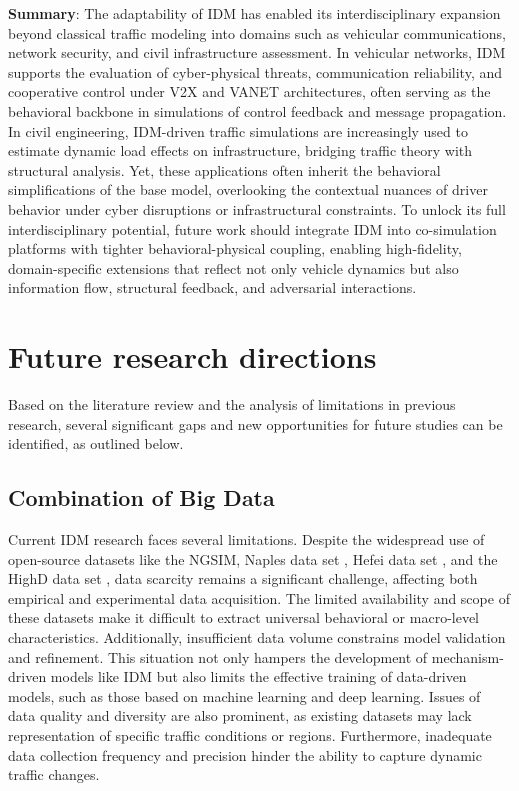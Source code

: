 \documentclass[a4paper,fleqn]{cas-sc}
\begin{document}
\textbf{Summary}: The adaptability of IDM has enabled its interdisciplinary expansion beyond classical traffic modeling into domains such as vehicular communications, network security, and civil infrastructure assessment. In vehicular networks, IDM supports the evaluation of cyber-physical threats, communication reliability, and cooperative control under V2X and VANET architectures, often serving as the behavioral backbone in simulations of control feedback and message propagation. In civil engineering, IDM-driven traffic simulations are increasingly used to estimate dynamic load effects on infrastructure, bridging traffic theory with structural analysis. Yet, these applications often inherit the behavioral simplifications of the base model, overlooking the contextual nuances of driver behavior under cyber disruptions or infrastructural constraints. To unlock its full interdisciplinary potential, future work should integrate IDM into co-simulation platforms with tighter behavioral-physical coupling, enabling high-fidelity, domain-specific extensions that reflect not only vehicle dynamics but also information flow, structural feedback, and adversarial interactions.




\section{Future research directions}
\label{sec:future}
Based on the literature review and the analysis of limitations in previous research, several significant gaps and new opportunities for future studies can be identified, as outlined below.

\subsection{Combination of Big Data}

Current IDM research faces several limitations. Despite the widespread use of open-source datasets like the NGSIM, Naples data set \citep{punzoAnalysisComparisonMicroscopicTraffic2005}, Hefei data set \citep{jiangExperimentalFeaturesCarfollowingBehavior2015}, and the HighD data set \citep{krajewskiHighDDatasetDroneDataset2018}, data scarcity remains a significant challenge, affecting both empirical and experimental data acquisition. The limited availability and scope of these datasets make it difficult to extract universal behavioral or macro-level characteristics. Additionally, insufficient data volume constrains model validation and refinement. This situation not only hampers the development of mechanism-driven models like IDM but also limits the effective training of data-driven models, such as those based on machine learning and deep learning. Issues of data quality and diversity are also prominent, as existing datasets may lack representation of specific traffic conditions or regions. Furthermore, inadequate data collection frequency and precision hinder the ability to capture dynamic traffic changes.
\end{document}

